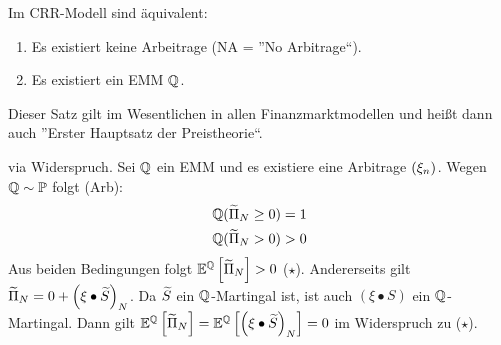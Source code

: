 \begin{theorem}
	Im CRR-Modell sind äquivalent:
	\begin{enumerate}
		\item Es existiert keine Arbeitrage (NA = ''No Arbitrage``).
		\item Es existiert ein EMM $\mathbb{Q}$.
	\end{enumerate}
\end{theorem}

\begin{*bemerkung_inline}
	Dieser Satz gilt im Wesentlichen in allen Finanzmarktmodellen und heißt dann auch ''Erster Hauptsatz der Preistheorie``.
\end{*bemerkung_inline}

\begin{proof_equiv}
	\rueckrichtung via Widerspruch. Sei $\mathbb{Q}$ ein EMM und es existiere eine Arbitrage $\left( \xi_n \right)_{}$. Wegen $\mathbb{Q} \sim \mathbb{P}$ folgt (Arb):
	\begin{equation*}
		\begin{aligned}
			\mathbb{Q}(\widetilde{\Pi}_N \ge 0) = 1 \\
			\mathbb{Q}(\widetilde{\Pi}_N > 0) > 0
		\end{aligned}
	\end{equation*}
	Aus beiden Bedingungen folgt $\mathbb{E}^{\mathbb{Q}}\left[ \widetilde{\Pi}_N \right] > 0$ ($\star$).
	Andererseits gilt $\widetilde{\Pi}_N = 0 + \left( \xi \bullet \widetilde{S} \right)_{N}$. Da $\widetilde{S}$ ein $\mathbb{Q}$-Martingal ist, ist auch $(\xi \bullet S)$ ein $\mathbb{Q}$-Martingal. Dann gilt $\mathbb{E}^{\mathbb{Q}} \left[ \widetilde{\Pi}_N \right] = \mathbb{E}^{\mathbb{Q}}\left[ \left( \xi \bullet \widetilde{S} \right)_{N} \right] = 0$ im Widerspruch zu ($\star$).
\end{proof_equiv}